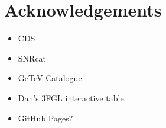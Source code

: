 \section{Acknowledgements}

\begin{itemize}

\item CDS
\item SNRcat
\item GeTeV Catalogue
\item Dan's 3FGL interactive table
\item GitHub Pages?

\end{itemize}
